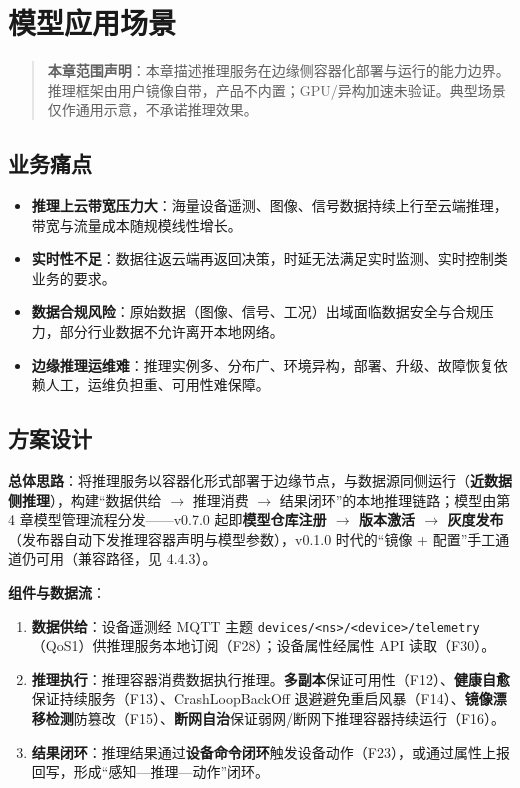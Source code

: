 \chapter{模型应用场景}

\begin{quote}
\textbf{本章范围声明}：本章描述推理服务在边缘侧容器化部署与运行的能力边界。推理框架由用户镜像自带，产品不内置；GPU/异构加速未验证。典型场景仅作通用示意，不承诺推理效果。
\end{quote}

\section{业务痛点}

\begin{itemize}
  \item \textbf{推理上云带宽压力大}：海量设备遥测、图像、信号数据持续上行至云端推理，带宽与流量成本随规模线性增长。
  \item \textbf{实时性不足}：数据往返云端再返回决策，时延无法满足实时监测、实时控制类业务的要求。
  \item \textbf{数据合规风险}：原始数据（图像、信号、工况）出域面临数据安全与合规压力，部分行业数据不允许离开本地网络。
  \item \textbf{边缘推理运维难}：推理实例多、分布广、环境异构，部署、升级、故障恢复依赖人工，运维负担重、可用性难保障。
\end{itemize}

\section{方案设计}

\textbf{总体思路}：将推理服务以容器化形式部署于边缘节点，与数据源同侧运行（\textbf{近数据侧推理}），构建“数据供给 $\rightarrow$ 推理消费 $\rightarrow$ 结果闭环”的本地推理链路；模型由第 4 章模型管理流程分发——v0.7.0 起即\textbf{模型仓库注册 $\rightarrow$ 版本激活 $\rightarrow$ 灰度发布}（发布器自动下发推理容器声明与模型参数），v0.1.0 时代的“镜像 + 配置”手工通道仍可用（兼容路径，见 4.4.3）。

\textbf{组件与数据流}：

\begin{enumerate}
  \item \textbf{数据供给}：设备遥测经 MQTT 主题 \texttt{devices/<ns>/<device>/telemetry}（QoS1）供推理服务本地订阅（F28）；设备属性经属性 API 读取（F30）。
  \item \textbf{推理执行}：推理容器消费数据执行推理。\textbf{多副本}保证可用性（F12）、\textbf{健康自愈}保证持续服务（F13）、CrashLoopBackOff 退避避免重启风暴（F14）、\textbf{镜像漂移检测}防篡改（F15）、\textbf{断网自治}保证弱网/断网下推理容器持续运行（F16）。
  \item \textbf{结果闭环}：推理结果通过\textbf{设备命令闭环}触发设备动作（F23），或通过属性上报回写，形成“感知—推理—动作”闭环。
\end{enumerate}

